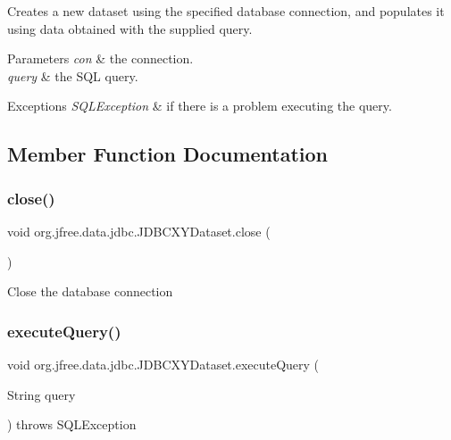 Creates a new dataset using the specified database connection, and populates it using data obtained with the supplied query.


\begin{DoxyParams}{Parameters}
{\em con} & the connection. \\
\hline
{\em query} & the S\+QL query.\\
\hline
\end{DoxyParams}

\begin{DoxyExceptions}{Exceptions}
{\em S\+Q\+L\+Exception} & if there is a problem executing the query. \\
\hline
\end{DoxyExceptions}


\subsection{Member Function Documentation}
\mbox{\label{classorg_1_1jfree_1_1data_1_1jdbc_1_1_j_d_b_c_x_y_dataset_af14d34fcc16829d00dc1cae5eb03dfd9}} 
\subsubsection{\texorpdfstring{close()}{close()}}
{\footnotesize\ttfamily void org.\+jfree.\+data.\+jdbc.\+J\+D\+B\+C\+X\+Y\+Dataset.\+close (\begin{DoxyParamCaption}{ }\end{DoxyParamCaption})}

Close the database connection \mbox{\label{classorg_1_1jfree_1_1data_1_1jdbc_1_1_j_d_b_c_x_y_dataset_ab027debfa7099261834007c4371c9cc3}} 
\subsubsection{\texorpdfstring{execute\+Query()}{executeQuery()}\hspace{0.1cm}{\footnotesize\ttfamily [1/2]}}
{\footnotesize\ttfamily void org.\+jfree.\+data.\+jdbc.\+J\+D\+B\+C\+X\+Y\+Dataset.\+execute\+Query (\begin{DoxyParamCaption}\item[{String}]{query }\end{DoxyParamCaption}) throws S\+Q\+L\+Exception}

